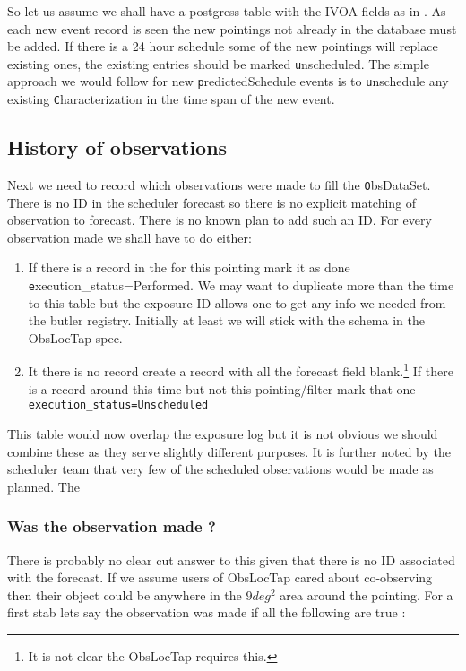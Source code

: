 


So let us assume we shall have a postgress table with the IVOA fields as in .
As each new event record is seen the new pointings not already in the database must be added.
If there is a 24 hour schedule some of the new pointings will replace existing ones, the existing entries should be marked {\texttt unscheduled}.
The simple approach we would follow  for new {\texttt predictedSchedule} events is to {\texttt unschedule} any existing {\texttt Characterization} in the time span of the new event.

\subsection{History of observations}
Next we need to record which observations were made to fill the {\texttt ObsDataSet}.
There is no ID in the scheduler forecast so there is no explicit matching of observation to forecast.
There is no known plan to add such an ID.
For every observation made we shall have to do either:
\begin{enumerate}
\item If there is a record in the \DB for this pointing mark it as done {\texttt execution\_status=Performed}.  We may want to duplicate more than the time to this table but the exposure ID allows one to get any info we needed from the butler registry.
Initially at least we will stick with the schema in the ObsLocTap spec.
\item It there is no record create a record with  all the forecast field blank.\footnote{It is not clear the ObsLocTap requires this.} If there is a record around this time but not this pointing/filter mark that one  \texttt{execution\_status=Unscheduled}
\end{enumerate}

This table would now overlap the exposure log but it is not obvious we should combine these as they serve slightly different purposes.
It is further noted by the scheduler team that very few of the scheduled observations would be made as planned. The

\subsubsection{Was the  observation made ?}\label{sec:made}
There is probably no clear cut answer to this given that there is no ID associated with the forecast.
If we assume users of ObsLocTap cared about co-observing then their object could be anywhere in the
$9 deg^2$ area around the pointing.
For a first stab lets say the observation was made if all the following are true :

